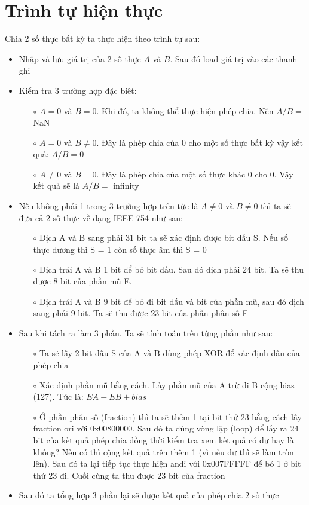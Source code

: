 \documentclass[a4paper]{article}
\begin{document}
\section{Trình tự hiện thực}
Chia 2 số thực bất kỳ ta thực hiện theo trình tự sau:
\begin{itemize}
	\item Nhập và lưu giá trị của 2 số thực $A$ và $B$. Sau đó load giá trị vào các thanh ghi
	\item Kiểm tra 3 trường hợp đặc biêt:
	  \begin{itemize}
		\item [$\circ$] $A = 0$ và $B = 0$. Khi đó, ta không thể thực hiện phép chia. Nên $A / B = $ NaN
		\item [$\circ$] $A = 0$ và $B \ne 0$. Đây là phép chia của 0 cho một số thực bất kỳ vậy kết quả: $A / B = 0$
		\item [$\circ$] $A \ne 0$ và $B = 0$. Đây là phép chia của một số thực khác 0 cho 0. Vậy kết quả sẽ là $A / B = $ infinity
	  \end{itemize}
	\item Nếu không phải 1 trong 3 trường hợp trên tức là $A \ne 0$ và $B \ne 0$ thì ta sẽ đưa cả 2 số thực về dạng IEEE 754 như sau:
	  \begin{itemize}
		\item [$\circ$] Dịch A và B sang phải 31 bit ta sẽ xác định được bit dấu S. Nếu số thực dương thì S = 1 còn số thực âm thì S = 0
		\item [$\circ$] Dịch trái A và B 1 bit để bỏ bit dấu. Sau đó dịch phải 24 bit. Ta sẽ thu được 8 bit của phần mũ E.
		\item [$\circ$] Dịch trái A và B 9 bit để bỏ đi bit dấu và bit của phần mũ, sau đó dịch sang phải 9 bit. Ta sẽ thu được 23 bit của phần phân số F
	  \end{itemize}
   \item Sau khi tách ra làm 3 phần. Ta sẽ tính toán trên từng phần như sau:
    \begin{itemize}
   	\item [$\circ$] Ta sẽ lấy 2 bit dấu S của A và B dùng phép XOR để xác định dấu của phép chia
   	\item [$\circ$] Xác định phần mũ bằng cách. Lấy phần mũ của A trừ đi B cộng bias (127). Tức là: $EA - EB + bias$
   	\item [$\circ$] Ở phần phân số (fraction) thì ta sẽ thêm 1 tại bit thứ 23 bằng cách lấy fraction ori với 0x00800000. Sau đó ta dùng vòng lặp (loop) để lấy ra 24 bit của kết quả phép chia đồng thời kiểm tra xem kết quả có dư hay là không? Nếu có thì cộng kết quả trên thêm 1 (vì nếu dư thì sẽ làm tròn lên). Sau đó ta lại tiếp tục thực hiện andi với 0x007FFFFF để bỏ 1 ở bit thứ 23 đi. Cuối cùng ta thu được 23 bit của fraction
   \end{itemize}
	\item Sau đó ta tổng hợp 3 phần lại sẽ được kết quả của phép chia 2 số thực
\end{itemize}
\end{document}
